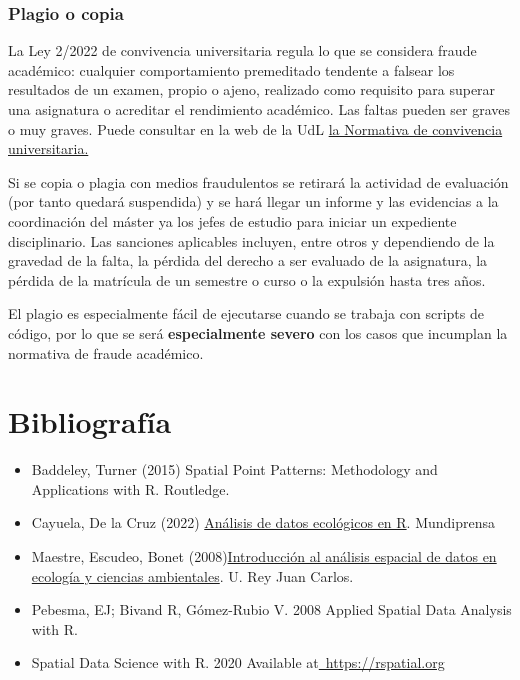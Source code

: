\documentclass[
  letterpaper,
  DIV=11,
  numbers=noendperiod]{scrreprt}
\begin{document}
\hypertarget{plagio-o-copia}{%
\subsubsection*{\texorpdfstring{\textbf{Plagio o
copia}}{Plagio o copia}}\label{plagio-o-copia}}

La Ley 2/2022 de convivencia universitaria regula lo que se considera
fraude académico: cualquier comportamiento premeditado tendente a
falsear los resultados de un examen, propio o ajeno, realizado como
requisito para superar una asignatura o acreditar el rendimiento
académico. Las faltas pueden ser graves o muy graves. Puede consultar en
la web de la UdL
\href{https://www.udl.cat/export/sites/universitat-lleida/ca/udl/norma/.galleries/docs/Organitzacio_interna/Acord-19-2023-CG-28.2.2023-Normativa-de-Convivencia-Universitaria-UdL.pdf}{la
Normativa de convivencia universitaria.}

Si se copia o plagia con medios fraudulentos se retirará la actividad de
evaluación (por tanto quedará suspendida) y se hará llegar un informe y
las evidencias a la coordinación del máster ya los jefes de estudio para
iniciar un expediente disciplinario. Las sanciones aplicables incluyen,
entre otros y dependiendo de la gravedad de la falta, la pérdida del
derecho a ser evaluado de la asignatura, la pérdida de la matrícula de
un semestre o curso o la expulsión hasta tres años.

El plagio es especialmente fácil de ejecutarse cuando se trabaja con
scripts de código, por lo que se será \textbf{especialmente severo} con
los casos que incumplan la normativa de fraude académico.

\hypertarget{bibliografuxeda}{%
\section*{Bibliografía}\label{bibliografuxeda}}


\begin{itemize}
\item
  Baddeley, Turner (2015) Spatial Point Patterns: Methodology and
  Applications with R. Routledge.
\item
  Cayuela, De la Cruz (2022)
  \href{https://www.mundiprensa.com/catalogo/9788484768333/analisis-de-datos-ecologicos-en-r?utm_source=pocket_mylist}{Análisis
  de datos ecológicos en R}. Mundiprensa
\item
  Maestre, Escudeo, Bonet
  (2008)\href{https://dialnet.unirioja.es/servlet/libro?codigo=347765}{Introducción
  al análisis espacial de datos en ecología y ciencias ambientales}. U.
  Rey Juan Carlos.
\item
  Pebesma, EJ; Bivand R, Gómez-Rubio V. 2008 Applied Spatial Data
  Analysis with R.~
\item
  Spatial Data Science with R. 2020 Available
  at\href{https://rspatial.org}{~https://rspatial.org}
\end{itemize}
\end{document}
